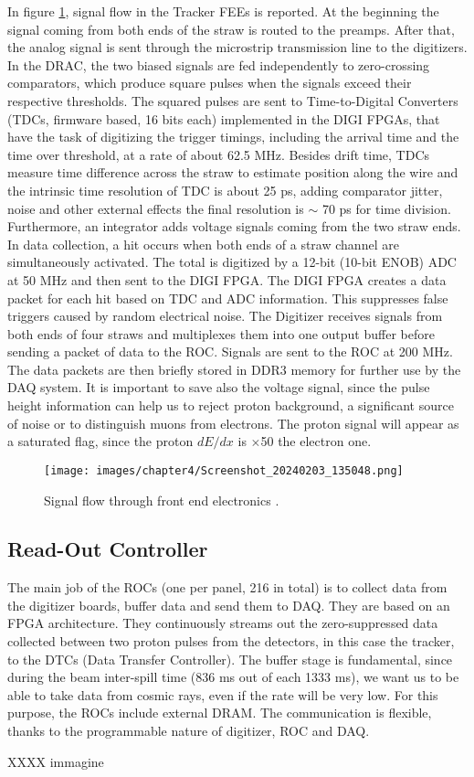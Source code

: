 In figure \ref{fig:flowfee}, signal flow in the Tracker FEEs is reported. At the beginning the signal coming from both ends of the straw is routed to the preamps. After that, the analog signal is sent through the microstrip transmission line to the digitizers. In the DRAC, the two biased signals are fed independently to zero-crossing comparators, which produce square pulses when the signals exceed their respective thresholds. The squared pulses are sent to Time-to-Digital Converters (TDCs, firmware based, 16 bits each) implemented in the DIGI FPGAs, that have the task of digitizing the trigger timings, including the arrival time and the time over threshold, at a rate of about 62.5 MHz. Besides drift time, TDCs measure time difference across the straw to estimate position along the wire and the intrinsic time resolution of TDC is about 25 ps, adding comparator jitter, noise and other external effects the final resolution is $\sim$ 70 ps for time division. Furthermore, an integrator adds voltage signals coming from the two straw ends. In data collection, a hit occurs when both ends of a straw channel are simultaneously activated. The total is digitized by a 12-bit (10-bit ENOB) ADC at 50 MHz and then sent to the DIGI FPGA. The DIGI FPGA creates a data packet for each hit based on TDC and ADC information. This suppresses false triggers caused by random electrical noise. The Digitizer receives signals from both ends of four straws and multiplexes them into one output buffer before sending a packet of data to the ROC. Signals are sent to the ROC at 200 MHz. The data packets are then briefly stored in DDR3 memory for further use by the DAQ system. It is important to save also the voltage signal, since the pulse height information can help us to reject proton background, a significant source of noise or to distinguish muons from electrons. The proton signal will appear as a saturated flag, since the proton $dE/dx$ is $\times$50 the electron one.
\begin{figure}[!h]
\centering
\texttt{[image: images/chapter4/Screenshot\_20240203\_135048.png]}
\caption{Signal flow through front end electronics \cite{bartoszek2015mu2e}.}
\label{fig:flowfee}
\end{figure}

\subsection{Read-Out Controller}\label{ROC} 
The main job of the ROCs (one per panel, 216 in total) is to collect data from the digitizer boards, buffer data and send them to DAQ. They are based on an FPGA architecture. They continuously streams out the zero-suppressed data collected between two proton pulses from the detectors, in this case the tracker, to the DTCs (Data Transfer Controller)\cite{GIOIOSA2023167732}. The buffer stage is fundamental, since during the beam inter-spill time (836 ms out of each 1333 ms), we want us to be able to take data from cosmic rays, even if the rate will be very low. For this purpose, the ROCs include external DRAM. The communication is flexible, thanks to the programmable nature of digitizer, ROC and DAQ. 

XXXX immagine 
